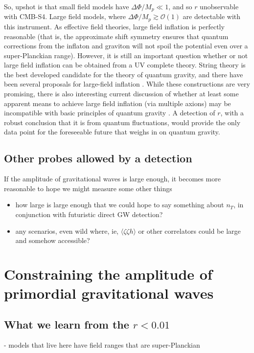 So, upshot is that small field models have $\Delta\Phi/M_p\ll 1$, and so $r$ unobservable with CMB-S4. Large field models, where $\Delta\Phi/M_p\gtrsim\mathcal{O}(1)$ are detectable with this instrument. As effective field theories, large field inflation is perfectly reasonable \cite{Linde:2005ht, Kaloper:2011jz, Csaki:2014bua,Kaplan:2015fuy,Choi:2015fiu} (that is, the approximate shift symmetry ensures that quantum corrections from the inflaton and graviton will not spoil the potential even over a super-Planckian range). However, it is still an important question whether or not large field inflation can be obtained from a UV complete theory. String theory is the best developed candidate for the theory of quantum gravity, and there have been several proposals for large-field inflation \cite{Silverstein:2008sg, McAllister:2008hb, Berg:2009tg, Palti:2014kza,McAllister:2014mpa, Marchesano:2014mla, Blumenhagen:2015xpa}. While these constructions are very promising, there is also interesting current discussion of whether at least some apparent means to achieve large field inflation (via multiple axions) may be incompatible with basic principles of quantum gravity \cite{delaFuente:2014aca,Bachlechner:2015qja,Heidenreich:2015wga,Kooner:2015rza}. A detection of $r$, with a robust conclusion that it is from quantum fluctuations, would provide the only data point for the foreseeable future that weighs in on quantum gravity.

\subsection{Other probes allowed by a detection}
If the amplitude of gravitational waves is large enough, it becomes more reasonable to hope we might measure some other things
 \begin{itemize}
\item how large is large enough that we could hope to say something about $n_T$, in conjunction with futuristic direct GW detection?
\item any scenarios, even wild where, ie, $\langle\zeta\zeta h\rangle$ or other correlators could be large and somehow accessible?
 \end{itemize}

\section{Constraining the amplitude of primordial gravitational waves} 
\subsection{What we learn from the $r<0.01$}
- models that live here have field ranges that are super-Planckian




